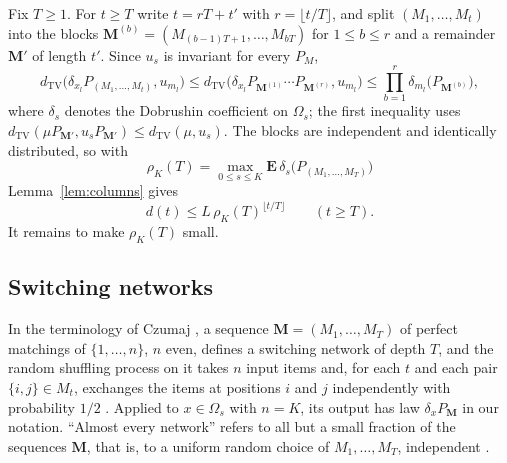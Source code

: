 \documentclass[11pt]{amsart}
\theoremstyle{remark}
\numberwithin{equation}{section}
\newcommand{\TV}{d_{\mathrm{TV}}}
\newcommand{\E}{\mathbf E}
\begin{document}
Fix $T\ge1$. For $t\ge T$ write $t=rT+t'$ with $r=\lfloor t/T\rfloor$, and split $(M_1,\dots,M_t)$ into the blocks $\mathbf M^{(b)}=(M_{(b-1)T+1},\dots,M_{bT})$ for $1\le b\le r$ and a remainder $\mathbf M'$ of length $t'$. Since $u_s$ is invariant for every $P_M$,
\[
\TV\bigl(\delta_{x_l}P_{(M_1,\dots,M_t)},u_{m_l}\bigr)\le\TV\bigl(\delta_{x_l}P_{\mathbf M^{(1)}}\cdots P_{\mathbf M^{(r)}},u_{m_l}\bigr)\le\prod_{b=1}^r\delta_{m_l}\bigl(P_{\mathbf M^{(b)}}\bigr),
\]
where $\delta_s$ denotes the Dobrushin coefficient on $\Omega_s$; the first inequality uses $\TV(\mu P_{\mathbf M'},u_s P_{\mathbf M'})\le\TV(\mu,u_s)$. The blocks are independent and identically distributed, so with
\begin{equation}\label{eq:rho}
\rho_K(T)=\max_{0\le s\le K}\E\,\delta_s\bigl(P_{(M_1,\dots,M_T)}\bigr)
\end{equation}
Lemma~\ref{lem:columns} gives
\begin{equation}\label{eq:main}
d(t)\le L\,\rho_K(T)^{\lfloor t/T\rfloor}\qquad(t\ge T).
\end{equation}
It remains to make $\rho_K(T)$ small.

\subsection{Switching networks}\label{subsec:networks}
In the terminology of Czumaj \cite{Cz15}, a sequence $\mathbf M=(M_1,\dots,M_T)$ of perfect matchings of $\{1,\dots,n\}$, $n$ even, defines a switching network of depth $T$, and the random shuffling process on it takes $n$ input items and, for each $t$ and each pair $\{i,j\}\in M_t$, exchanges the items at positions $i$ and $j$ independently with probability $1/2$ \cite[Section~1.1]{Cz15}. Applied to $x\in\Omega_s$ with $n=K$, its output has law $\delta_x P_{\mathbf M}$ in our notation. ``Almost every network'' refers to all but a small fraction of the sequences $\mathbf M$, that is, to a uniform random choice of $M_1,\dots,M_T$, independent \cite[Section~1.1 and Theorem~3.5]{Cz15}.
\end{document}
